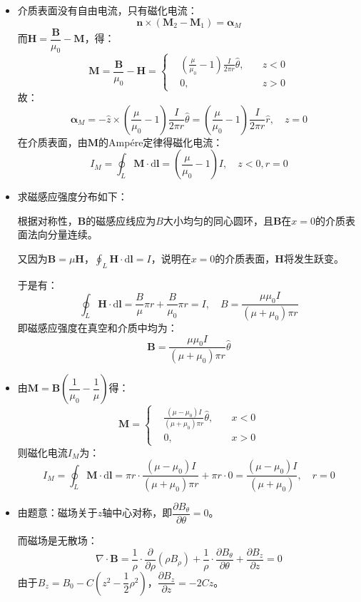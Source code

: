 \documentclass[a4paper,fontset=none]{ctexart}
\begin{document}
\begin{itemize}
    \item[3.(2)]
    介质表面没有自由电流，只有磁化电流：
    \[
    \bm{n}\times(\bm{M}_2-\bm{M}_1) = \bm{\alpha}_M
    \]
    而$\bm{H}=\dfrac{\bm{B}}{\mu_0}-\bm{M}$，得：
    \[
    \bm{M} = \frac{\bm{B}}{\mu_0}-\bm{H} =
    \left\{
        \begin{aligned}
            &\left(\frac{\mu}{\mu_0}-1\right)\frac{I}{2\pi r}\hat{\theta},\quad &z<0 \\
            &0,\quad &z>0
        \end{aligned}
    \right.
    \]
    故：
    \[
    \bm{\alpha}_M = -\hat{z}\times\left(\frac{\mu}{\mu_0}-1\right)\frac{I}{2\pi r}\hat{\theta} = \left(\frac{\mu}{\mu_0}-1\right)\frac{I}{2\pi r}\hat{r},\quad z=0
    \]
    在介质表面，由$\bm{M}$的Amp\'{e}re定律得磁化电流：
    \[
    I_M = \oint_L \bm{M}\cdot\mathrm{d}\bm{l} = \left(\frac{\mu}{\mu_0}-1\right)I,\quad z<0,r=0
    \]

    \item[4.(1)]
    求磁感应强度分布如下：

    根据对称性，$\bm{B}$的磁感应线应为$B$大小均匀的同心圆环，且$\bm{B}$在$x=0$的介质表面法向分量连续。

    又因为$\bm{B}=\mu\bm{H}$，$\displaystyle{\oint_L \bm{H}\cdot\mathrm{d}\bm{l}=I}$，说明在$x=0$的介质表面，$\bm{H}$将发生跃变。

    于是有：
    \[
    \oint_L \bm{H}\cdot\mathrm{d}\bm{l} = \frac{B}{\mu}\pi r + \frac{B}{\mu_0}\pi r = I,\quad B = \frac{\mu\mu_0 I}{(\mu+\mu_0)\pi r}
    \]
    即磁感应强度在真空和介质中均为：
    \[
    \bm{B} = \frac{\mu\mu_0 I}{(\mu+\mu_0)\pi r}\hat{\theta}
    \]

    \item[4.(2)]
    由$\bm{M}=\bm{B}\left(\dfrac{1}{\mu_0}-\dfrac{1}{\mu}\right)$得：
    \[
    \bm{M} =
    \left\{
        \begin{aligned}
            &\frac{(\mu-\mu_0)I}{(\mu+\mu_0)\pi r}\hat{\theta},\quad &x<0 \\
            &0,\quad &x>0
        \end{aligned}
    \right.
    \]
    则磁化电流$I_M$为：
    \[
    I_M = \oint_L \bm{M}\cdot\mathrm{d}\bm{l} = \pi r \cdot \frac{(\mu-\mu_0)I}{(\mu+\mu_0)\pi r} + \pi r \cdot 0 = \frac{(\mu-\mu_0)I}{(\mu+\mu_0)},\quad r=0
    \]

    \item[5.]
    由题意：磁场关于$z$轴中心对称，即$\dfrac{\partial B_\theta}{\partial\theta}=0$。

    而磁场是无散场：
    \[
    \nabla\cdot\bm{B} = \frac{1}{\rho}\cdot\frac{\partial}{\partial\rho}(\rho B_\rho) + \frac{1}{\rho}\cdot\frac{\partial B_\theta}{\partial\theta} + \frac{\partial B_z}{\partial z} = 0
    \]
    由于$B_z=B_0-C(z^2-\dfrac{1}{2}\rho^2)$，$\dfrac{\partial B_z}{\partial z}=-2Cz$。


\end{itemize}
\end{document}
